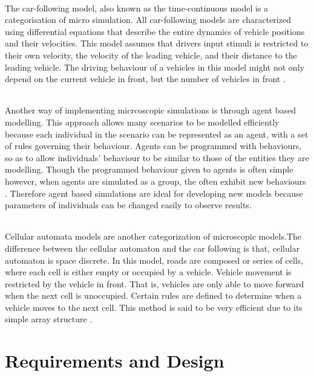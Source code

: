 \documentclass[a4paper,11pt,titlepage]{article}
\begin{document}
\paragraph{}
The car-following model, also known as the time-continuous model is a categorisation of micro simulation. All car-following models are characterized using differential equations that  describe the entire dynamics of vehicle positions and their velocities. This model assumes that drivers input stimuli is restricted to their own velocity, the velocity of the leading vehicle, and their distance to the leading vehicle. The driving behaviour of a vehicles in this model might not only depend on the current vehicle in front, but the number of vehicles in front \cite{macrosim}.
\paragraph{}
Another way of implementing micrcoscopic simulations is through agent based modelling. This approach allows many scenarios to be modelled efficiently because each individual in the scenario can be represented as an agent, with a set of rules governing their behaviour. Agents can be programmed with behaviours, so as to allow individuals' behaviour to be similar to those of the entities they are modelling. Though the programmed behaviour given to agents is often simple however, when agents are simulated as a group, the often exhibit new behaviours \cite{2}.
Therefore agent based simulations are ideal for developing new models  because parameters of individuals can be changed easily to observe results.
\paragraph{}
Cellular automata models are another categorization of microscopic models.The difference between the cellular automaton and the car following is that, cellular automaton is space discrete. In this model, roads are composed or series of cells, where each cell is either empty or occupied by a vehicle. Vehicle movement is restricted by the vehicle in front. That is, vehicles are only able to move forward when the next cell is unoccupied. Certain rules are defined  to determine when a vehicle moves to the next cell. This method is said to be very efficient due to its simple array structure \cite{Ali}.

\part{Requirements and Design}
\end{document}
